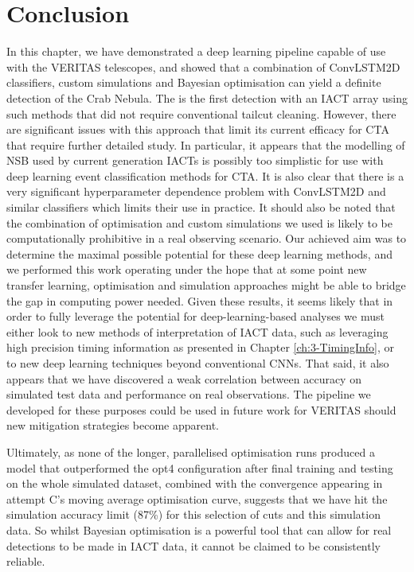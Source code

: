 \section{Conclusion}
In this chapter, we have demonstrated a deep learning pipeline capable of use with the VERITAS telescopes, and showed that a combination of ConvLSTM2D classifiers, custom simulations and Bayesian optimisation can yield a definite detection of the Crab Nebula. The is the first detection with an IACT array using such methods that did not require conventional tailcut cleaning. However, there are significant issues with this approach that limit its current efficacy for CTA that require further detailed study. In particular, it appears that the modelling of NSB used by current generation IACTs is possibly too simplistic for use with deep learning event classification methods for CTA. It is also clear that there is a very significant hyperparameter dependence problem with ConvLSTM2D and similar classifiers which limits their use in practice. It should also be noted that the combination of optimisation and custom simulations we used is likely to be computationally prohibitive in a real observing scenario. Our achieved aim was to determine the maximal possible potential for these deep learning methods, and we performed this work operating under the hope that at some point new transfer learning, optimisation and simulation approaches might be able to bridge the gap in computing power needed. Given these results, it seems likely that in order to fully leverage the potential for deep-learning-based analyses we must either look to new methods of interpretation of IACT data, such as leveraging high precision timing information as presented in Chapter \ref{ch:3-TimingInfo}, or to new deep learning techniques beyond conventional CNNs. That said, it also appears that we have discovered a weak correlation between accuracy on simulated test data and performance on real observations. The pipeline we developed for these purposes could be used in future work for VERITAS should new mitigation strategies become apparent.

Ultimately, as none of the longer, parallelised optimisation runs produced a model that outperformed the opt4 configuration after final training and testing on the whole simulated dataset, combined with the convergence appearing in attempt C's moving average optimisation curve, suggests that we have hit the simulation accuracy limit (87\%) for this selection of cuts and this simulation data. So whilst Bayesian optimisation is a powerful tool that can allow for real detections to be made in IACT data, it cannot be claimed to be consistently reliable.